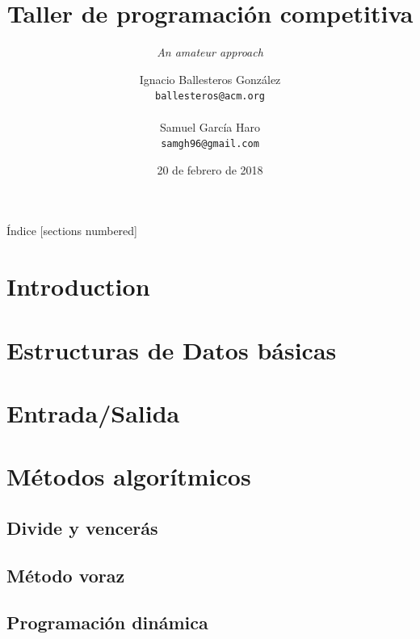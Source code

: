\documentclass[10pt]{beamer}
\title{Taller de programación competitiva}
\subtitle{\textit{An amateur approach}}
\date{20 de febrero de 2018}
\author{
  Ignacio Ballesteros González\\
  {\color{mygray}\texttt{ballesteros@acm.org}\\}
  \\
  Samuel García Haro\\
  {\color{mygray}\texttt{samgh96@gmail.com}\\}
}
\institute{}
\begin{document}
\maketitle

\begin{frame}{Índice}
  [sections numbered]
  \tableofcontents[hideallsubsections]
\end{frame}

\section{Introduction}

\section{Estructuras de Datos básicas}

\section{Entrada/Salida}

\section{Métodos algorítmicos}

\subsection{Divide y vencerás}

\subsection{Método voraz}

\subsection{Programación dinámica}
\end{document}
